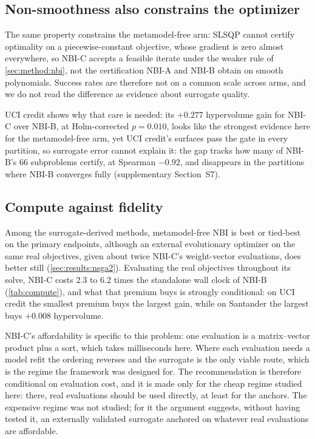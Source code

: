 \subsection{Non-smoothness also constrains the optimizer}
\label{sec:disc:solver}

The same property constrains the metamodel-free arm: SLSQP cannot certify optimality on a piecewise-constant
objective, whose gradient is zero almost everywhere, so NBI-C accepts a feasible iterate under the weaker rule of
\cref{sec:method:nbi}, not the certification NBI-A and NBI-B obtain on smooth polynomials. Success rates are
therefore not on a common scale across arms, and we do not read the difference as evidence about surrogate quality.

UCI credit shows why that care is needed: its $+0.277$ hypervolume gain for NBI-C over NBI-B, at Holm-corrected
$p = 0.010$, looks like the strongest evidence here for the metamodel-free arm, yet UCI credit's surfaces pass the
gate in every partition, so surrogate error cannot explain it: the gap tracks how many of NBI-B's 66 subproblems
certify, at Spearman $-0.92$, and disappears in the partitions where NBI-B converges fully (supplementary
Section~S7).

\subsection{Compute against fidelity}
\label{sec:disc:compute}

Among the surrogate-derived methods, metamodel-free NBI is best or tied-best on the primary endpoints, although an
external evolutionary optimizer on the same real objectives, given about twice NBI-C's weight-vector evaluations,
does better still (\cref{sec:results:nsga2}). Evaluating the real objectives throughout its solve, NBI-C costs 2.3 to
6.2 times the standalone wall clock of NBI-B (\cref{tab:compute}), and what that premium buys is strongly conditional:
on UCI credit the smallest premium buys the largest gain, while on Santander the largest buys $+0.008$ hypervolume.

NBI-C's affordability is specific to this problem: one evaluation is a matrix--vector product plus a sort, which
takes milliseconds here. Where each evaluation needs a model refit the ordering reverses and the surrogate is the only
viable route, which is the regime the framework was designed for. The recommendation is therefore conditional on
evaluation cost, and it is made only for the cheap regime studied here: there, real evaluations should be used
directly, at least for the anchors. The expensive regime was not studied; for it the argument suggests, without
having tested it, an externally validated surrogate anchored on whatever real evaluations are affordable.


